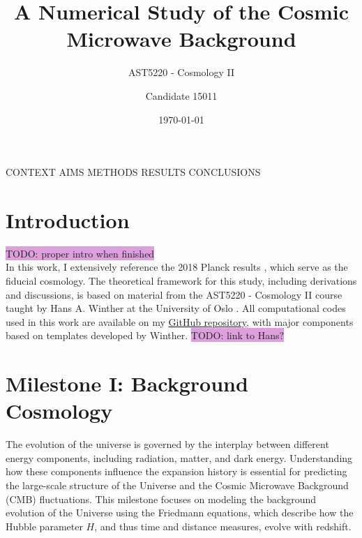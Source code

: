 \documentclass{aa}
\begin{document}
 


   \title{A Numerical Study of the Cosmic Microwave Background}

   \subtitle{AST5220 - Cosmology II}

   \author{Candidate 15011
          }


   \date{\today}

 
  \abstract

  {CONTEXT}
  {AIMS}
  {METHODS}
  {RESULTS}
  {CONCLUSIONS}

   \maketitle
%
\section{Introduction}\label{sec: introduction}
\colorbox{Plum}{TODO: proper intro when finished} \\

In this work, I extensively reference the 2018 Planck results \citep[see][]{Planck}, which serve as the fiducial cosmology. The theoretical framework for this study, including derivations and discussions, is based on material from the AST5220 - Cosmology II course taught by Hans A. Winther at the University of Oslo \citep[see][]{Course}. All computational codes used in this work are available on my \href{https://github.com/paljettrosa/AST5220}{GitHub repository}, with major components based on templates developed by Winther. \colorbox{Plum}{TODO: link to Hans?}

\section{Milestone I: Background Cosmology}\label{sec: milestone I}
The evolution of the universe is governed by the interplay between different energy components, including radiation, matter, and dark energy. Understanding how these components influence the expansion history is essential for predicting the large-scale structure of the Universe and the Cosmic Microwave Background (CMB) fluctuations. This milestone focuses on modeling the background evolution of the Universe using the Friedmann equations, which describe how the Hubble parameter $H$, and thus time and distance measures, evolve with redshift. 
\end{document}
